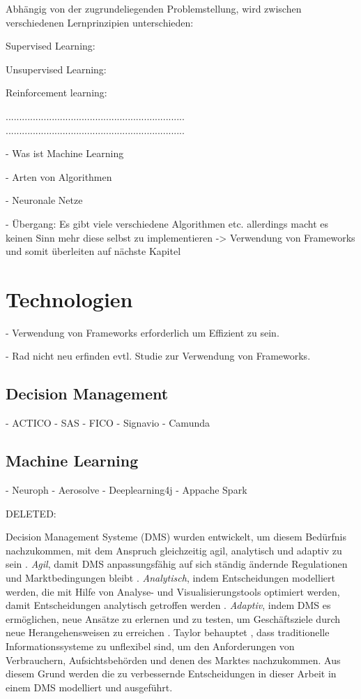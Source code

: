 Abhängig von der zugrundeliegenden Problemstellung, wird zwischen verschiedenen Lernprinzipien unterschieden:    

\begin{enumerate*}
\item Supervised Learning: 
\item Unsupervised Learning: 
\item Reinforcement learning:
\end{enumerate*}    

..................................................................
..................................................................

- Was ist Machine Learning

- Arten von Algorithmen 

- Neuronale Netze 

- Übergang: Es gibt viele verschiedene Algorithmen etc. allerdings macht es keinen Sinn mehr diese selbst zu implementieren -> Verwendung von Frameworks und somit überleiten auf nächste Kapitel

\section{Technologien}
\label{sec:Technologien2}

- Verwendung von Frameworks erforderlich um Effizient zu sein.

- Rad nicht neu erfinden evtl. Studie zur Verwendung von Frameworks.

\subsection{Decision Management}
\label{subsec:Decision_Management2}

- ACTICO 
- SAS
- FICO 
- Signavio
- Camunda

\subsection{Machine Learning}
\label{subsec:Machine_Learning2}

- Neuroph
- Aerosolve 
- Deeplearning4j
- Appache Spark

DELETED:

Decision Management Systeme (DMS) wurden entwickelt, um diesem Bedürfnis nachzukommen, mit dem Anspruch gleichzeitig agil, analytisch und adaptiv zu sein \cite[vgl. S. 1]{JT12}. \textit{Agil}, damit DMS anpassungsfähig auf sich ständig ändernde Regulationen und Marktbedingungen bleibt \cite[vgl. S. 4]{JT11}. \textit{Analytisch}, indem Entscheidungen modelliert werden, die mit Hilfe von Analyse- und Visualisierungstools optimiert werden, damit Entscheidungen analytisch getroffen werden \cite[vgl. S. 8]{JT11}. \textit{Adaptiv}, indem DMS es ermöglichen, neue Ansätze zu erlernen und zu testen, um Geschäftsziele durch neue Herangehensweisen zu erreichen \cite[vgl. S. 15]{JT11}. Taylor behauptet \cite[vgl. S. 1]{JT12}, dass traditionelle Informationssysteme zu unflexibel sind, um den Anforderungen von Verbrauchern, Aufsichtsbehörden und denen des Marktes nachzukommen. Aus diesem Grund werden die zu verbessernde Entscheidungen in dieser Arbeit in einem DMS modelliert und ausgeführt. 

